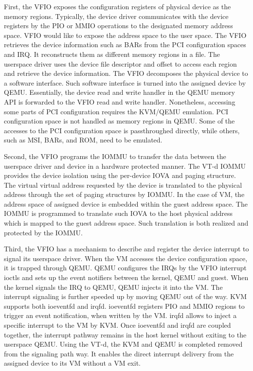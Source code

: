 First, the VFIO exposes the configuration registers of
physical device as the memory regions. Typically, the device
driver communicates with the device registers by the PIO or
MMIO operations to the designated memory address space. VFIO
would like to expose the address space to the user space. The
VFIO retrieves the device information such as BARs from the
PCI configuration spaces and IRQ. It reconstructs them as
different memory regions in a file. The userspace driver uses
the device file descriptor and offset to access each region
and retrieve the device information. The VFIO decomposes the
physical device to a software interface. Such software
interface is turned into the assigned device by QEMU.
Essentially, the device read and write handler in the QEMU
memory API is forwarded to the VFIO read and write handler.
Nonetheless, accessing some parts of PCI configuration
requires the KVM/QEMU emulation. PCI configuration space is
not handled as memory regions in QEMU. Some of the accesses to
the PCI configuration space is passthroughed directly, while
others, such as MSI, BARs, and ROM, need to be emulated.

Second, the VFIO programs the IOMMU to transfer the data
between the userspace driver and device in a hardware
protected manner. The VT-d IOMMU provides the device isolation
using the per-device IOVA and paging structure. The virtual
virtual address requested by the device is translated to the
physical address through the set of paging structures by
IOMMU. In the case of VM, the address space of assigned device
is embedded within the guest address space. The IOMMU is
programmed to translate such IOVA to the host physical address
which is mapped to the guest address space. Such translation
is both realized and protected by the IOMMU.

Third, the VFIO has a mechanism to describe and register the
device interrupt to signal its userspace driver. When the VM
accesses the device configuration space, it is trapped through
QEMU. QEMU configures the IRQs by the VFIO interrupt ioctls
and sets up the event notifiers between the kernel, QEMU and
guest. When the kernel signals the IRQ to QEMU, QEMU injects
it into the VM. The interrupt signaling is further speeded up
by moving QEMU out of the way. KVM supports both ioeventfd and
irqfd. ioeventfd registers PIO and MMIO regions to trigger an
event notification, when written by the VM. irqfd allows to
inject a specific interrupt to the VM by KVM. Once ioeventfd
and irqfd are coupled together, the interrupt pathway remains
in the host kernel without exiting to the userspace QEMU.
Using the VT-d, the KVM and QEMU is completed removed from the
signaling path way. It enables the direct interrupt delivery
from the assigned device to its VM without a VM exit.

